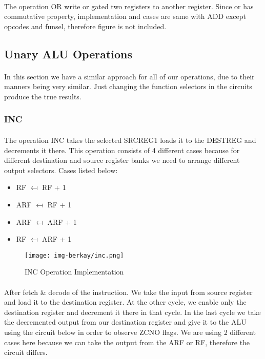 \documentclass{article}
\begin{document}
\paragraph{}
The operation OR write or gated two registers to another register. Since or has commutative property, implementation and cases are same with ADD except opcodes and funsel, therefore figure is not included. 


\newpage
\subsection{Unary ALU Operations}
\paragraph{}
In this section we have a similar approach for all of our operations, due to their manners being very similar. Just changing the function selectors in the circuits produce the true results. 
\subsubsection{INC}
\paragraph{}
The operation INC takes the selected SRCREG1 loads it to the DESTREG and decrements it there. This operation consists of 4 different cases because for different destination and source register banks we need to arrange different output selectors. Cases listed below:
\begin{itemize}
    \item RF $\mapsfrom$ RF + 1
    \item ARF $\mapsfrom$ RF + 1
    \item ARF $\mapsfrom$ ARF + 1
    \item RF $\mapsfrom$ ARF + 1
\end{itemize}

\begin{figure}[h]
    \centering
    \texttt{[image: img-berkay/inc.png]}
    \caption{INC Operation Implementation}
    \label{fig:inc}
\end{figure}

\newpage
\paragraph{}
After fetch \& decode of the instruction. We take the input from source register and load it to the destination register. At the other cycle, we enable only the destination register and decrement it there in that cycle. In the last cycle we take the decremented output from our destination register and give it to the ALU using the circuit below in order to observe ZCNO flags. We are using 2 different cases here because we can take the output from the ARF or RF, therefore the circuit  differs.
\end{document}
